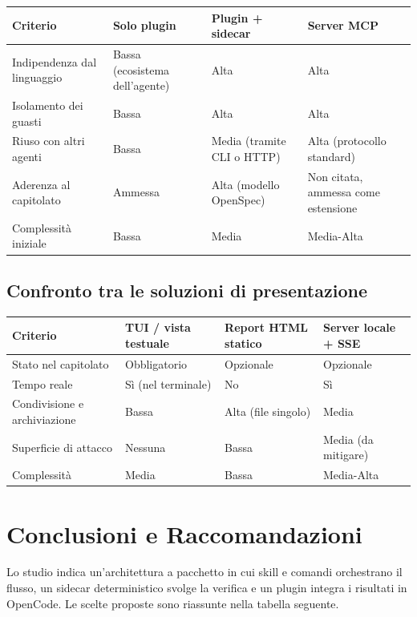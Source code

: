 \documentclass[a4paper, 11pt]{article}
\begin{document}
\vspace{0.3cm}
\noindent
\begin{tabularx}{\textwidth}{|l|X|X|X|}
    \hline
    \textbf{Criterio} & \textbf{Solo plugin} & \textbf{Plugin + sidecar} & \textbf{Server MCP} \\ \hline
    Indipendenza dal linguaggio & Bassa (ecosistema dell'agente) & Alta & Alta \\ \hline
    Isolamento dei guasti & Bassa & Alta & Alta \\ \hline
    Riuso con altri agenti & Bassa & Media (tramite CLI o HTTP) & Alta (protocollo standard) \\ \hline
    Aderenza al capitolato & Ammessa & Alta (modello OpenSpec) & Non citata, ammessa come estensione \\ \hline
    Complessità iniziale & Bassa & Media & Media-Alta \\ \hline
\end{tabularx}
\vspace{0.3cm}

\subsection{Confronto tra le soluzioni di presentazione}

\vspace{0.3cm}
\noindent
\begin{tabularx}{\textwidth}{|l|X|X|X|}
    \hline
    \textbf{Criterio} & \textbf{TUI / vista testuale} & \textbf{Report HTML statico} & \textbf{Server locale + SSE} \\ \hline
    Stato nel capitolato & Obbligatorio & Opzionale & Opzionale \\ \hline
    Tempo reale & Sì (nel terminale) & No & Sì \\ \hline
    Condivisione e archiviazione & Bassa & Alta (file singolo) & Media \\ \hline
    Superficie di attacco & Nessuna & Bassa & Media (da mitigare) \\ \hline
    Complessità & Media & Bassa & Media-Alta \\ \hline
\end{tabularx}
\vspace{0.3cm}


\section{Conclusioni e Raccomandazioni}
\label{sec:conclusioni}
Lo studio indica un'architettura a pacchetto in cui skill e comandi orchestrano il flusso, un sidecar deterministico svolge la verifica e un plugin integra i risultati in OpenCode. Le scelte proposte sono riassunte nella tabella seguente.
\end{document}
